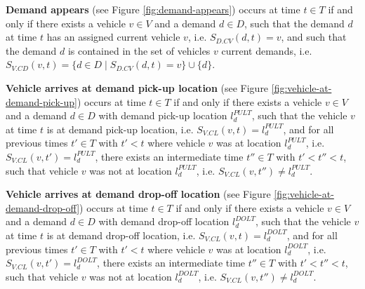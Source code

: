 \documentclass[graybox]{svmult}
\begin{document}
\noindent
\textbf{Demand appears} (see Figure \ref{fig:demand-appears}) 
occurs at time $t \in T$ if and only if there exists a vehicle $v \in V$ and a demand $d \in D$, such that the demand $d$ at time $t$ has an assigned current vehicle $v$, i.e. $S_{D.CV}(d, t) = v$, and such that the demand $d$ is contained in the set of vehicles $v$ current demands, i.e. $S_{V.CD}(v, t) = \{d \in D \mid S_{D.CV}(d, t) = v\}  \cup \{d\}$.
\vspace{4mm}

\noindent
\textbf{Vehicle arrives at demand pick-up location} (see Figure \ref{fig:vehicle-at-demand-pick-up}) 
occurs at time $t \in T$ if and only if there exists a vehicle $v \in V$ and a demand $d \in D$ with demand pick-up location $l_d^{PULT}$, such that the vehicle $v$ at time $t$ is at demand pick-up location, i.e. $S_{V.CL}(v, t) = l_d^{PULT}$, and for all previous times $t' \in T$ with $t' < t$ where vehicle $v$ was at location $l_d^{PULT}$, i.e. $S_{V.CL}(v, t') = l_d^{PULT}$, there exists an intermediate time $t'' \in T$ with $t' < t'' < t$, such that vehicle $v$ was not at location $l_d^{PULT}$, i.e. $S_{V.CL}(v, t'') \neq l_d^{PULT}$.


\vspace{4mm}

\noindent
\textbf{Vehicle arrives at demand drop-off location} (see Figure \ref{fig:vehicle-at-demand-drop-off})
occurs at time $t \in T$ if and only if there exists a vehicle $v \in V$ and a demand $d \in D$ with demand drop-off location $l_d^{DOLT}$, such that the vehicle $v$ at time $t$ is at demand drop-off location, i.e. $S_{V.CL}(v, t) = l_d^{DOLT}$, and for all previous times $t' \in T$ with $t' < t$ where vehicle $v$ was at location $l_d^{DOLT}$, i.e. $S_{V.CL}(v, t') = l_d^{DOLT}$, there exists an intermediate time $t'' \in T$ with $t' < t'' < t$, such that vehicle $v$ was not at location $l_d^{DOLT}$, i.e. $S_{V.CL}(v, t'') \neq l_d^{DOLT}$.

\vspace{-2mm}
\end{document}
